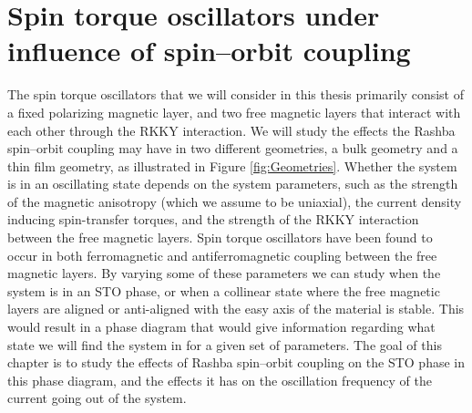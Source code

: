 \section{Spin torque oscillators under influence of spin--orbit coupling}
The spin torque oscillators that we will consider in this thesis primarily consist of a fixed polarizing magnetic layer, and two free magnetic layers that interact with each other through the RKKY interaction. We will study the effects the Rashba spin--orbit coupling may have in two different geometries, a bulk geometry and a thin film geometry, as illustrated in Figure \ref{fig:Geometries}. Whether the system is in an oscillating state depends on the system parameters, such as the strength of the magnetic anisotropy (which we assume to be uniaxial), the current density inducing spin-transfer torques, and the strength of the RKKY interaction between the free magnetic layers. Spin torque oscillators have been found to occur in both ferromagnetic \cite{Zhou2013} and antiferromagnetic \cite{Klein2012} coupling between the free magnetic layers. By varying some of these parameters we can study when the system is in an STO phase, or when a collinear state where the free magnetic layers are aligned or anti-aligned with the easy axis of the material is stable. This would result in a phase diagram that would give information regarding what state we will find the system in for a given set of parameters. The goal of this chapter is to study the effects of Rashba spin--orbit coupling on the STO phase in this phase diagram, and the effects it has on the oscillation frequency of the current going out of the system. 
